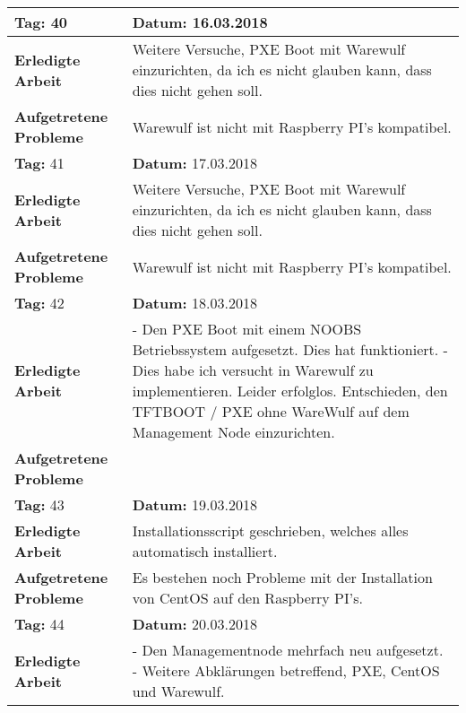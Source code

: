 \begin{longtable}{|p{5cm}|p{5cm}p{6cm}|}
\rowcolor{heading}\textbf{Tag:} 40 & \textbf{Datum:} 16.03.2018 & \\ \hline
\textbf{Erledigte Arbeit} & \multicolumn{2}{p{11cm}|}{Weitere Versuche, PXE Boot mit Warewulf einzurichten, da ich es nicht glauben kann, dass dies nicht gehen soll.} \\ \hline
\textbf{Aufgetretene Probleme} & \multicolumn{2}{p{11cm}|}{Warewulf ist nicht mit Raspberry PI's kompatibel.} \\ \hline
\rowcolor{heading}\textbf{Tag:} 41 & \textbf{Datum:} 17.03.2018 & \\ \hline
\textbf{Erledigte Arbeit} & \multicolumn{2}{p{11cm}|}{Weitere Versuche, PXE Boot mit Warewulf einzurichten, da ich es nicht glauben kann, dass dies nicht gehen soll.} \\ \hline
\textbf{Aufgetretene Probleme} & \multicolumn{2}{p{11cm}|}{Warewulf ist nicht mit Raspberry PI's kompatibel.} \\ \hline
\rowcolor{heading}\textbf{Tag:} 42 & \textbf{Datum:} 18.03.2018 & \\ \hline
\textbf{Erledigte Arbeit} & \multicolumn{2}{p{11cm}|}{- Den PXE Boot mit einem NOOBS Betriebssystem aufgesetzt. Dies hat funktioniert. \newline
- Dies habe ich versucht in Warewulf zu implementieren. Leider erfolglos. \newline
Entschieden, den TFTBOOT / PXE ohne WareWulf auf dem Management Node einzurichten.} \\ \hline
\textbf{Aufgetretene Probleme \newline \newline } & \multicolumn{2}{p{11cm}|}{} \\ \hline
\rowcolor{heading}\textbf{Tag:} 43 & \textbf{Datum:} 19.03.2018 & \\ \hline
\textbf{Erledigte Arbeit} & \multicolumn{2}{p{11cm}|}{Installationsscript geschrieben, welches alles automatisch installiert.} \\ \hline
\textbf{Aufgetretene Probleme} & \multicolumn{2}{p{11cm}|}{Es bestehen noch Probleme mit der Installation von CentOS auf den Raspberry PI's.} \\ \hline
\rowcolor{heading}\textbf{Tag:} 44 & \textbf{Datum:} 20.03.2018 & \\ \hline
\textbf{Erledigte Arbeit} & \multicolumn{2}{p{11cm}|}{- Den Managementnode mehrfach neu aufgesetzt. \newline
- Weitere Abklärungen betreffend, PXE, CentOS und Warewulf.} \\ \hline

\end{longtable}
